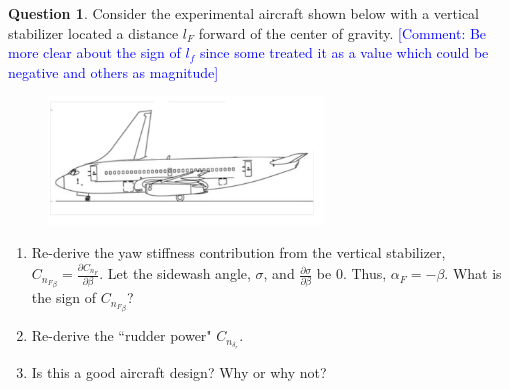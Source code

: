 \documentclass{article}
\newcommand{\comment}[1]{\textcolor{blue}{[Comment: #1]}}
\theoremstyle{definition}
\newtheorem{question}{Question}
\begin{document}
\begin{question}
    Consider the experimental aircraft shown below with a vertical stabilizer located a distance $l_F$ forward of the center of gravity. \comment{Be more clear about the sign of $l_f$ since some treated it as a value which could be negative and others as magnitude}
    \begin{figure}[h]
        \centering
        \includegraphics[width=0.65\textwidth]{ForwardVStab.png}
    \end{figure}
    \begin{enumerate}
        \item Re-derive the yaw stiffness contribution from the vertical stabilizer, $C_{{n_F}_\beta} = \frac{\partial C_{{n_F}}}{\partial \beta}$. Let the sidewash angle, $\sigma$, and $\frac{\partial \sigma}{\partial \beta}$ be 0. Thus, $\alpha_F = -\beta$. What is the sign of $C_{{n_F}_\beta}$?
        \item Re-derive the ``rudder power" $C_{n_{\delta_r}}$.
        \item Is this a good aircraft design? Why or why not?
    \end{enumerate}
\end{question}

\vspace{0.1cm}

\clearpage
\end{document}
